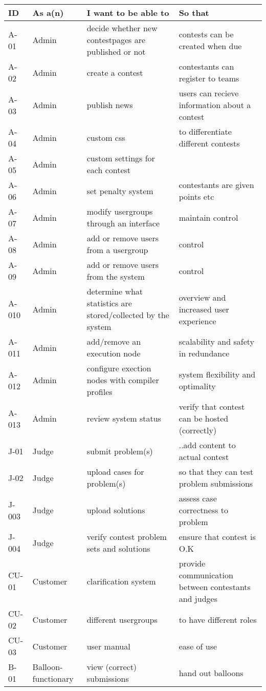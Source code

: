 \newpage
\begin{tabular}{|l|p{1.5cm}|p{4.0cm}|p{3.5cm}|}
\hline
ID&As a(n) &I want to be able to&So that \\
\hline
A-01&Admin&decide whether new contestpages are published or not& contests can be created when due \\
\hline
A-02&Admin &create a contest &contestants can register to teams\\
\hline
A-03&Admin&publish news&users can recieve information about a contest \\
\hline
A-04&Admin&custom css & to differentiate different contests\\
\hline
A-05&Admin&custom settings for each contest & \\
\hline
A-06&Admin&set penalty system&contestants are given points etc\\
\hline
A-07&Admin&modify usergroups through an interface&maintain control\\
\hline
A-08&Admin&add or remove users from a usergroup&control\\
\hline
A-09&Admin&add or remove users from the system&control\\
\hline
A-010&Admin&determine what statistics are stored/collected by the system&overview and increased user experience\\
\hline
A-011&Admin&add/remove an execution node&scalability and safety in redundance\\
\hline
A-012&Admin&configure exection nodes with compiler profiles&system flexibility and optimality\\
\hline
A-013&Admin&review system status&verify that contest can be hosted (correctly)\\
\hline
J-01&Judge&submit problem(s)&..add content to actual contest\\
\hline
J-02&Judge&upload cases for problem(s)&so that they can test problem submissions\\
\hline
J-003&Judge&upload solutions&assess case correctness to problem\\
\hline
J-004&Judge&verify contest problem sets and solutions&ensure that contest is O.K\\
\hline
CU-01&Customer&clarification system&provide communication between contestants and judges\\
\hline
CU-02&Customer& different usergroups&to have different roles\\
\hline
CU-03&Customer&user manual&ease of use\\
\hline
B-01&Balloon-functionary&view (correct) submissions&hand out balloons\\

\end{tabular}
